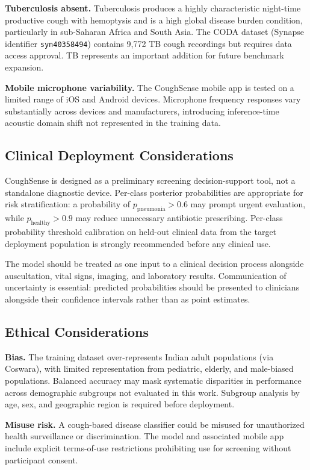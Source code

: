 \documentclass[10pt,journal,compsoc]{IEEEtran}
\begin{document}
\textbf{Tuberculosis absent.}
Tuberculosis produces a highly characteristic night-time productive cough
with hemoptysis and is a high global disease burden condition, particularly
in sub-Saharan Africa and South Asia. The CODA dataset (Synapse
identifier \texttt{syn40358494}) contains 9{,}772 TB cough recordings
but requires data access approval. TB represents an important addition
for future benchmark expansion.

\textbf{Mobile microphone variability.}
The CoughSense mobile app is tested on a limited range of iOS and
Android devices. Microphone frequency responses vary substantially
across devices and manufacturers, introducing inference-time acoustic
domain shift not represented in the training data.

\subsection{Clinical Deployment Considerations}

CoughSense is designed as a preliminary screening decision-support tool,
not a standalone diagnostic device.
Per-class posterior probabilities are appropriate for risk stratification:
a probability of $p_\mathrm{pneumonia} > 0.6$ may prompt urgent evaluation,
while $p_\mathrm{healthy} > 0.9$ may reduce unnecessary antibiotic
prescribing.
Per-class probability threshold calibration on held-out clinical data
from the target deployment population is strongly recommended before
any clinical use.

The model should be treated as one input to a clinical decision process
alongside auscultation, vital signs, imaging, and laboratory results.
Communication of uncertainty is essential: predicted probabilities
should be presented to clinicians alongside their confidence intervals
rather than as point estimates.

\subsection{Ethical Considerations}

\textbf{Bias.} The training dataset over-represents Indian adult populations
(via Coswara), with limited representation from pediatric, elderly,
and male-biased populations. Balanced accuracy may mask systematic
disparities in performance across demographic subgroups not evaluated
in this work. Subgroup analysis by age, sex, and geographic region
is required before deployment.

\textbf{Misuse risk.} A cough-based disease classifier could be misused
for unauthorized health surveillance or discrimination. The model and
associated mobile app include explicit terms-of-use restrictions
prohibiting use for screening without participant consent.
\end{document}

